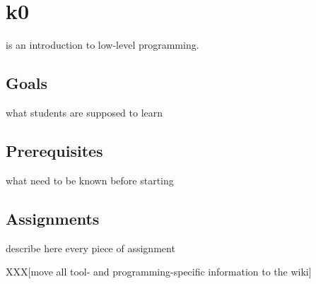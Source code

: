 %
%
%
%
%
%

%
%

\chapter{k0}
\label{chapter:k0}

 is an introduction to low-level programming.

\newpage

%
%

\section{Goals}

what students are supposed to learn

\section{Prerequisites}

what need to be known before starting

\section{Assignments}

describe here every piece of assignment



XXX[move all tool- and programming-specific information to the wiki]
